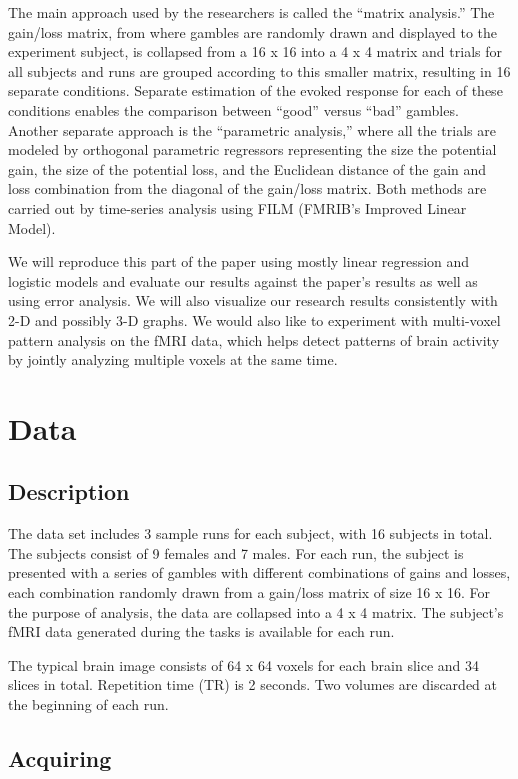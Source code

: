 \documentclass[11pt]{article}
\begin{document}
The main approach used by the researchers is called the ``matrix analysis.''
The gain/loss matrix, from where gambles are randomly drawn and displayed to
the experiment subject, is collapsed from a 16 x 16 into a 4 x 4 matrix and
trials for all subjects and runs are grouped according to this smaller matrix,
resulting in 16 separate conditions. Separate estimation of the evoked response
for each of these conditions enables the comparison between ``good'' versus
``bad'' gambles. Another separate approach is the ``parametric analysis,''
where all the trials are modeled by orthogonal parametric regressors
representing the size the potential gain, the size of the potential loss, and
the Euclidean distance of the gain and loss combination from the diagonal of
the gain/loss matrix. Both methods are carried out by time-series analysis
using FILM (FMRIB’s Improved Linear Model).

We will reproduce this part of the paper using mostly linear regression and
logistic models and evaluate our results against the paper's results as well as
using error analysis. We will also visualize our research results consistently
with 2-D and possibly 3-D graphs. We would also like to experiment with
multi-voxel pattern analysis on the fMRI data, which helps detect patterns of
brain activity by jointly analyzing multiple voxels at the same time. 

\section{Data}

\subsection{Description}

The data set includes 3 sample runs for each subject, with 16 subjects in
total. The subjects consist of 9 females and 7 males. For each run, the subject
is presented with a series of gambles with different combinations of gains and
losses, each combination randomly drawn from a gain/loss matrix of size 16 x
16. For the purpose of analysis, the data are collapsed into a 4 x 4 matrix.
The subject's fMRI data generated during the tasks is available for each run.

The typical brain image consists of 64 x 64 voxels for each brain slice and 34
slices in total. Repetition time (TR) is 2 seconds. Two volumes are discarded
at the beginning of each run.

\subsection{Acquiring}
\end{document}
